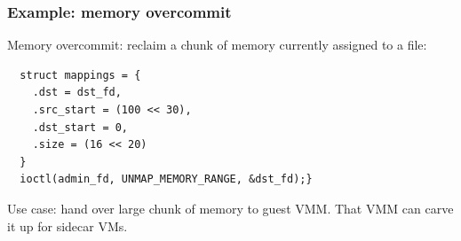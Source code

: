 \documentclass{beamer}
\begin{document}
\begin{frame}[fragile]
  \frametitle{Example: memory overcommit}
  Memory overcommit: reclaim a chunk of memory currently assigned to a file:

  \begin{verbatim}
  struct mappings = {
    .dst = dst_fd,
    .src_start = (100 << 30),
    .dst_start = 0,
    .size = (16 << 20)
  }
  ioctl(admin_fd, UNMAP_MEMORY_RANGE, &dst_fd);}
  \end{verbatim}
  \vspace{0.7cm}
  Use case: hand over large chunk of memory to guest VMM. That VMM can carve it up for sidecar VMs.
\end{frame}
\end{document}
